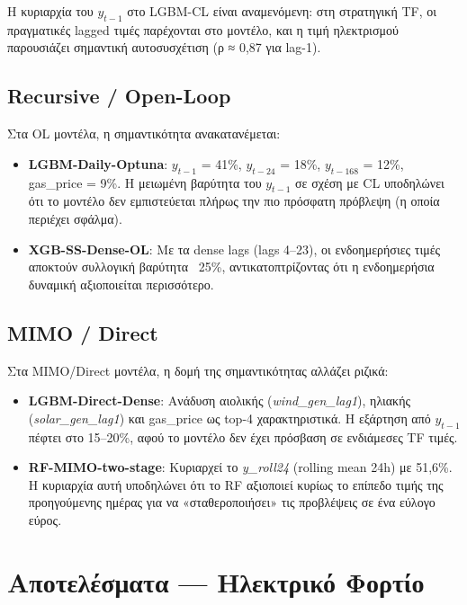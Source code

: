 Η κυριαρχία του $y_{t-1}$ στο LGBM-CL είναι αναμενόμενη: στη στρατηγική TF,
οι πραγματικές lagged τιμές παρέχονται στο μοντέλο, και η τιμή ηλεκτρισμού
παρουσιάζει σημαντική αυτοσυσχέτιση (ρ ≈ 0,87 για lag-1).

\subsection*{Recursive / Open-Loop}

Στα OL μοντέλα, η σημαντικότητα ανακατανέμεται:
\begin{itemize}
    \item \textbf{LGBM-Daily-Optuna}: $y_{t-1}$ = 41\%, $y_{t-24}$ = 18\%,
    $y_{t-168}$ = 12\%, gas\_price = 9\%. Η μειωμένη βαρύτητα του $y_{t-1}$
    σε σχέση με CL υποδηλώνει ότι το μοντέλο δεν εμπιστεύεται πλήρως την
    πιο πρόσφατη πρόβλεψη (η οποία περιέχει σφάλμα).
    \item \textbf{XGB-SS-Dense-OL}: Με τα dense lags (lags 4--23), οι ενδοημερήσιες
    τιμές αποκτούν συλλογική βαρύτητα ~25\%, αντικατοπτρίζοντας ότι η ενδοημερήσια
    δυναμική αξιοποιείται περισσότερο.
\end{itemize}

\subsection*{MIMO / Direct}

Στα MIMO/Direct μοντέλα, η δομή της σημαντικότητας αλλάζει ριζικά:
\begin{itemize}
    \item \textbf{LGBM-Direct-Dense}: Ανάδυση αιολικής (\textit{wind\_gen\_lag1}),
    ηλιακής (\textit{solar\_gen\_lag1}) και gas\_price ως top-4 χαρακτηριστικά.
    Η εξάρτηση από $y_{t-1}$ πέφτει στο 15--20\%, αφού το μοντέλο δεν έχει
    πρόσβαση σε ενδιάμεσες TF τιμές.
    \item \textbf{RF-MIMO-two-stage}: Κυριαρχεί το \textit{y\_roll24} (rolling
    mean 24h) με 51,6\%. Η κυριαρχία αυτή υποδηλώνει ότι το RF αξιοποιεί κυρίως
    το επίπεδο τιμής της προηγούμενης ημέρας για να «σταθεροποιήσει» τις
    προβλέψεις σε ένα εύλογο εύρος.
\end{itemize}

\section{Αποτελέσματα — Ηλεκτρικό Φορτίο}
\label{sec:fi_load}

